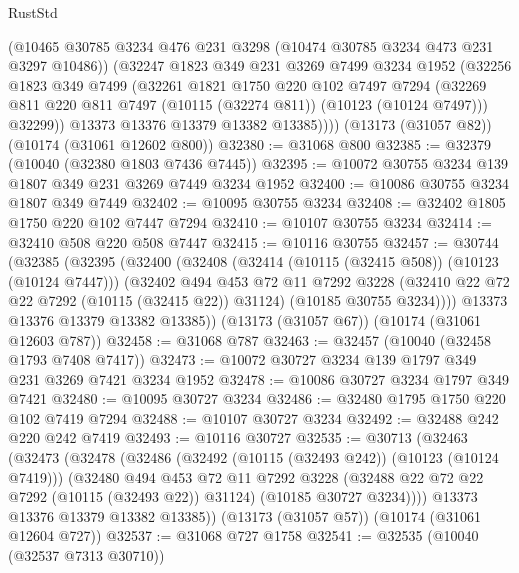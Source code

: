 \begin{lexlean}{RustStd}
\begin{coremodule}
          (@10465 @30785 @3234 @476 @231 @3298 (@10474 @30785 @3234 @473 @231 @3297 @10486))
          (@32247
            @1823
            @349
            @231
            @3269
            @7499
            @3234
            @1952
            (@32256
              @1823
              @349
              @7499
              (@32261
                @1821
                @1750
                @220
                @102
                @7497
                @7294
                (@32269 @811 @220 @811 @7497 (@10115 (@32274 @811)) (@10123 (@10124 @7497)))
                @32299))
            @13373
            @13376
            @13379
            @13382
            @13385))))
    (@13173 (@31057 @82))
    (@10174 (@31061 @12602 @800))
@32380 := @31068 @800
@32385 := @32379 (@10040 (@32380 @1803 @7436 @7445))
@32395 := @10072 @30755 @3234 @139 @1807 @349 @231 @3269 @7449 @3234 @1952
@32400 := @10086 @30755 @3234 @1807 @349 @7449
@32402 := @10095 @30755 @3234
@32408 := @32402 @1805 @1750 @220 @102 @7447 @7294
@32410 := @10107 @30755 @3234
@32414 := @32410 @508 @220 @508 @7447
@32415 := @10116 @30755
@32457 := @30744
    (@32385
      (@32395
        (@32400
          (@32408
            (@32414 (@10115 (@32415 @508)) (@10123 (@10124 @7447)))
            (@32402
              @494
              @453
              @72
              @11
              @7292
              @3228
              (@32410 @22 @72 @22 @7292 (@10115 (@32415 @22)) @31124)
              (@10185 @30755 @3234))))
        @13373
        @13376
        @13379
        @13382
        @13385))
    (@13173 (@31057 @67))
    (@10174 (@31061 @12603 @787))
@32458 := @31068 @787
@32463 := @32457 (@10040 (@32458 @1793 @7408 @7417))
@32473 := @10072 @30727 @3234 @139 @1797 @349 @231 @3269 @7421 @3234 @1952
@32478 := @10086 @30727 @3234 @1797 @349 @7421
@32480 := @10095 @30727 @3234
@32486 := @32480 @1795 @1750 @220 @102 @7419 @7294
@32488 := @10107 @30727 @3234
@32492 := @32488 @242 @220 @242 @7419
@32493 := @10116 @30727
@32535 := @30713
    (@32463
      (@32473
        (@32478
          (@32486
            (@32492 (@10115 (@32493 @242)) (@10123 (@10124 @7419)))
            (@32480
              @494
              @453
              @72
              @11
              @7292
              @3228
              (@32488 @22 @72 @22 @7292 (@10115 (@32493 @22)) @31124)
              (@10185 @30727 @3234))))
        @13373
        @13376
        @13379
        @13382
        @13385))
    (@13173 (@31057 @57))
    (@10174 (@31061 @12604 @727))
@32537 := @31068 @727 @1758
@32541 := @32535 (@10040 (@32537 @7313 @30710))

\end{coremodule}
\end{lexlean}
